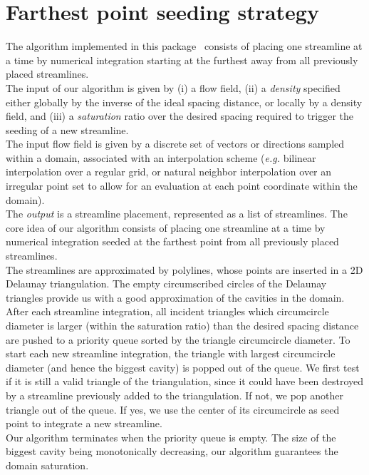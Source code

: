 \section{Farthest point seeding strategy}
\label{Section_2D_Streamlines_Strategy}
The algorithm implemented in this package~\cite{cgal:mad-fpsep-05} consists of placing one streamline at
a time by numerical integration starting at the furthest away from all
previously placed streamlines.\\The input of our algorithm is given by
(i) a flow field, (ii) a \textit{density} specified either globally by the
inverse of the ideal spacing distance, or locally by a density field, and (iii)
a \textit{saturation} ratio over the desired spacing required to trigger the
seeding of a new streamline.\\The input flow field is given by a discrete set of
vectors or directions sampled within a domain, associated with an interpolation
scheme (\textit{e.g.} bilinear interpolation over a regular grid, or natural
neighbor interpolation over an irregular point set to
allow for an evaluation at each point coordinate within the domain).\\The
\textit{output} is a streamline placement, represented as a list of streamlines.
The core idea of our algorithm consists of placing one streamline at a time by
numerical integration seeded at the farthest point from all previously placed
streamlines.\\The streamlines are approximated by polylines, whose points are
inserted in a 2D Delaunay triangulation. The empty circumscribed circles of the
Delaunay triangles provide us with a good approximation of the cavities in the
domain.\\After each streamline integration, all incident triangles which
circumcircle diameter is larger (within the saturation ratio) than the desired
spacing distance are pushed to a priority queue sorted by the triangle
circumcircle diameter. To start each new streamline integration, the triangle
with largest circumcircle diameter (and hence the biggest cavity) is popped out
of the queue. We first test if it is still a valid triangle of the
triangulation, since it could have been destroyed by a streamline previously
added to the triangulation. If not, we pop another triangle out of the queue. If
yes, we use the center of its circumcircle as seed point to integrate a new
streamline.\\Our algorithm terminates when the priority queue is empty. The size
of the biggest cavity being monotonically decreasing, our algorithm guarantees
the domain saturation.

